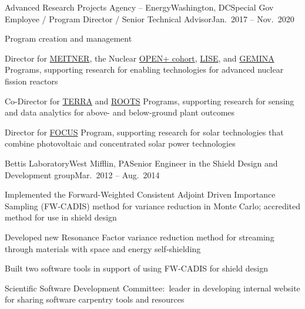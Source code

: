 \begin{rSubsection}{Advanced Research Projects Agency -- Energy}{Washington,
DC}{Special Gov Employee / Program Director / Senior Technical Advisor}{Jan.\
2017 -- Nov.\ 2020}
\item Program creation and management
\item Director for
\href{https://arpa-e.energy.gov/?q=arpa-e-programs/meitner}{MEITNER}, the
Nuclear
\href{https://arpa-e.energy.gov/?q=news-item/arpa-e-announces-12-million-five-projects-nuclear-materials-science}{OPEN+
cohort},
\href{https://arpa-e.energy.gov/?q=news-item/arpa-e-innovating-through-unconventional-ideas}{LISE}, and  \href{https://arpa-e.energy.gov/?q=workshop/optimal-operations-advanced-nuclear-reactors}{GEMINA} Programs, supporting research for enabling technologies for advanced nuclear fission reactors
\item Co-Director for \href{https://arpa-e.energy.gov/?q=arpa-e-programs/terra}{TERRA} and \href{https://arpa-e.energy.gov/?q=arpa-e-programs/roots}{ROOTS} Programs, supporting research for sensing and data analytics for above- and below-ground plant outcomes
\item Director for \href{https://arpa-e.energy.gov/?q=arpa-e-programs/focus}{FOCUS} Program, supporting research for solar technologies that combine photovoltaic and concentrated solar power technologies
\end{rSubsection}



\begin{rSubsection}{Bettis Laboratory}{West Mifflin, PA}{Senior Engineer in the Shield Design and Development group}{Mar.\ 2012 -- Aug.\ 2014}
\item Implemented the Forward-Weighted Consistent Adjoint Driven Importance Sampling (FW-CADIS) method for variance reduction in Monte Carlo; accredited method for use in shield design
\item Developed new Resonance Factor variance reduction method for streaming through materials with space and energy self-shielding
\item Built two software tools in support of using FW-CADIS for shield design
\item Scientific Software Development Committee:\ leader in developing internal website for sharing software carpentry tools and resources
\end{rSubsection}


